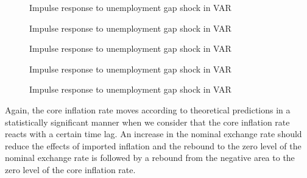 \documentclass[twoside]{article}
\begin{document}
\begin{multicols}{2}
\clearpage


\begin{figure}[H]
\resizebox{12 cm}{!}{}
\vspace*{-10mm}
\caption{Impulse response to unemployment gap shock in VAR}\label{fig:IRS_eeugap}
\end{figure}

\begin{figure}[H]
\resizebox{12 cm}{!}{}
\vspace*{-10mm}
\caption{Impulse response to unemployment gap shock in VAR}\label{fig:IRS_dlneer}
\end{figure}

\begin{figure}[H]
\resizebox{12 cm}{!}{}
\vspace*{-10mm}
\caption{Impulse response to unemployment gap shock in VAR}\label{fig:IRS_eemmrate}
\end{figure}

\begin{figure}[H]
\resizebox{12 cm}{!}{}
\vspace*{-10mm}
\caption{Impulse response to unemployment gap shock in VAR}\label{fig:IRS_dlprofitmrg}
\end{figure}



\begin{figure}[H]
\resizebox{12 cm}{!}{}
\vspace*{-10mm}
\caption{Impulse response to unemployment gap shock in VAR}\label{fig:IRS_dlcore}
\end{figure}
 

\newpage


Again, the core inflation rate moves according to theoretical predictions in a statistically significant manner when we consider that the core inflation rate reacts with a certain time lag. An increase in the nominal exchange rate should reduce the effects of imported inflation and the rebound to the zero level of the nominal exchange rate is followed by a rebound from the negative area to the zero level of the core inflation rate. 



\end{multicols}
\end{document}
